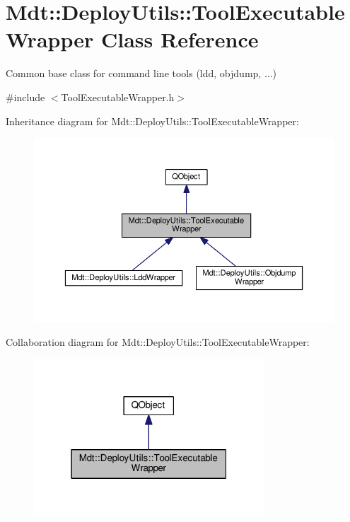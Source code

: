 \hypertarget{class_mdt_1_1_deploy_utils_1_1_tool_executable_wrapper}{}\section{Mdt\+:\+:Deploy\+Utils\+:\+:Tool\+Executable\+Wrapper Class Reference}
\label{class_mdt_1_1_deploy_utils_1_1_tool_executable_wrapper}


Common base class for command line tools (ldd, objdump, ...)  




{\ttfamily \#include $<$Tool\+Executable\+Wrapper.\+h$>$}



Inheritance diagram for Mdt\+:\+:Deploy\+Utils\+:\+:Tool\+Executable\+Wrapper\+:
\nopagebreak
\begin{figure}[H]
\begin{center}
\leavevmode
\includegraphics[width=350pt]{class_mdt_1_1_deploy_utils_1_1_tool_executable_wrapper__inherit__graph}
\end{center}
\end{figure}


Collaboration diagram for Mdt\+:\+:Deploy\+Utils\+:\+:Tool\+Executable\+Wrapper\+:
\nopagebreak
\begin{figure}[H]
\begin{center}
\leavevmode
\includegraphics[width=244pt]{class_mdt_1_1_deploy_utils_1_1_tool_executable_wrapper__coll__graph}
\end{center}
\end{figure}
